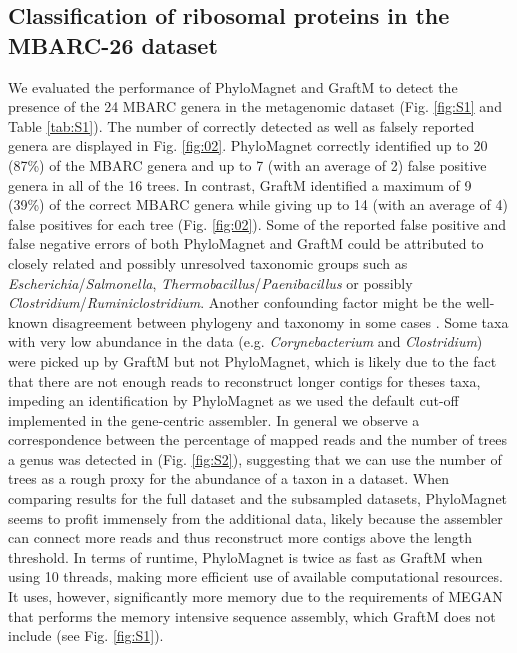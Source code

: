 \documentclass{bioinfo}
\begin{document}
\subsection{Classification of ribosomal proteins in the MBARC-26 dataset}

We evaluated the performance of PhyloMagnet and GraftM to detect the presence of the 24 MBARC genera \citep[23 of those detectable, as Nocardiopsis was part of the pooled community but not present in the sequence data from][]{Singer2016} in the metagenomic dataset (Fig. \ref{fig:S1} and Table \ref{tab:S1}). The number of correctly detected as well as falsely reported genera are displayed in Fig. \ref{fig:02}. PhyloMagnet correctly identified up to 20 (87\%) of the MBARC genera and up to 7 (with an average of 2) false positive genera in all of the 16 trees. In contrast, GraftM identified a maximum of 9 (39\%) of the correct MBARC genera while giving up to 14 (with an average of 4) false positives for each tree (Fig. \ref{fig:02}). Some of the reported false positive and false negative errors of both PhyloMagnet and GraftM could be attributed to closely related and possibly unresolved taxonomic groups such as \textit{Escherichia}/\textit{Salmonella}, \textit{Thermobacillus}/\textit{Paenibacillus} or possibly \textit{Clostridium}/\textit{Ruminiclostridium}. Another confounding factor might be the well-known disagreement between phylogeny and taxonomy in some cases \citep[e.g. \textit{Escherichia}/\textit{Salmonella};][]{Retchless2010}.  Some taxa with very low abundance in the data (e.g. \textit{Corynebacterium} and \textit{Clostridium}) were picked up by GraftM but not PhyloMagnet, which is likely due to the fact that there are not enough reads to reconstruct longer contigs for theses taxa, impeding an identification by PhyloMagnet as we used the default cut-off implemented in the gene-centric assembler. In general we observe a correspondence between the percentage of mapped reads \citep{Singer2016} and the number of trees a genus was detected in (Fig. \ref{fig:S2}), suggesting that we can use the number of trees as a rough proxy for the abundance of a taxon in a dataset.  
When comparing results for the full dataset and the subsampled datasets, PhyloMagnet seems to profit immensely from the additional data, likely because the assembler can connect more reads and thus reconstruct more contigs above the length threshold.
In terms of runtime, PhyloMagnet is twice as fast as GraftM when using 10 threads, making more efficient use of available computational resources. It uses, however, significantly more memory due to the requirements of MEGAN that performs the memory intensive sequence assembly, which GraftM does not include (see Fig. \ref{fig:S1}).
\end{document}
